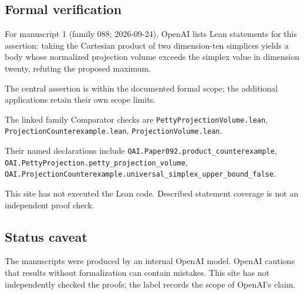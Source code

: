 \documentclass[11pt]{article}
\begin{document}
\subsection{Formal verification}
For manuscript 1 (family 088; 2026-09-24), OpenAI lists Lean statements for this assertion: taking the Cartesian product of two dimension-ten simplices yields a body whose normalized projection volume exceeds the simplex value in dimension twenty, refuting the proposed maximum.

The central assertion is within the documented formal scope; the additional applications retain their own scope limits.

The linked family Comparator checks are \texttt{PettyProjectionVolume.lean}, \texttt{ProjectionCounterexample.lean}, \texttt{ProjectionVolume.lean}.

Their named declarations include \texttt{OAI.Paper092.product\_counterexample}, \texttt{OAI.PettyProjection.petty\_projection\_volume}, \texttt{OAI.ProjectionCounterexample.universal\_simplex\_upper\_bound\_false}.

This site has not executed the Lean code. Described statement coverage is not an independent proof check.

\subsection{Status caveat}
The manuscripts were produced by an internal OpenAI model. OpenAI cautions that results without formalization can contain mistakes. This site has not independently checked the proofs; the label records the scope of OpenAI's claim.
\end{document}
